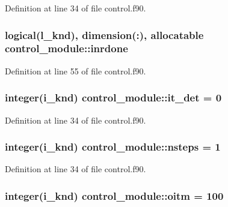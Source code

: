 Definition at line 34 of file control.\-f90.

\hypertarget{classcontrol__module_a800d3f9715c61376ad1a2d5b5b77e116}{
\subsubsection[{inrdone}]{\setlength{\rightskip}{0pt plus 5cm}logical(l\-\_\-knd), dimension(\-:), allocatable control\-\_\-module\-::inrdone}}\label{classcontrol__module_a800d3f9715c61376ad1a2d5b5b77e116}


Definition at line 55 of file control.\-f90.

\hypertarget{classcontrol__module_a47222ebdff0b8cbd932da30c43572177}{
\subsubsection[{it\-\_\-det}]{\setlength{\rightskip}{0pt plus 5cm}integer(i\-\_\-knd) control\-\_\-module\-::it\-\_\-det = 0}}\label{classcontrol__module_a47222ebdff0b8cbd932da30c43572177}


Definition at line 34 of file control.\-f90.

\hypertarget{classcontrol__module_a94e5569686ecc448c8fb807946cf95fb}{
\subsubsection[{nsteps}]{\setlength{\rightskip}{0pt plus 5cm}integer(i\-\_\-knd) control\-\_\-module\-::nsteps = 1}}\label{classcontrol__module_a94e5569686ecc448c8fb807946cf95fb}


Definition at line 34 of file control.\-f90.

\hypertarget{classcontrol__module_a99fddac51dc4299027ab5afd97c5c7ea}{
\subsubsection[{oitm}]{\setlength{\rightskip}{0pt plus 5cm}integer(i\-\_\-knd) control\-\_\-module\-::oitm = 100}}\label{classcontrol__module_a99fddac51dc4299027ab5afd97c5c7ea}


